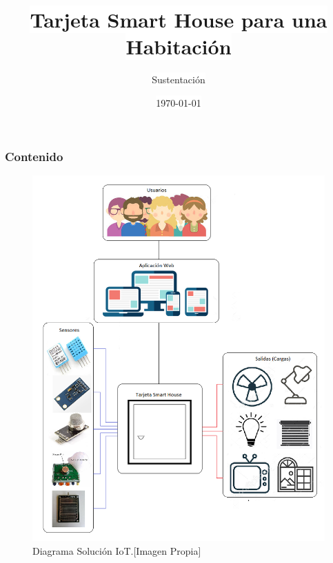 \documentclass[aspectratio=169]{beamer}
\title{\colorbox{white}{Tarjeta Smart House para una Habitación}}
\subtitle{\colorbox{white}{Sustentación}}
\author{\colorbox{white}{John Alejandro Barahona Pineda \and César Andres Tejada Torres}}
\institute{\colorbox{white}{Universidad del Quindío}\\
\colorbox{white}{Armenia, Quindío}}
\date{\colorbox{white}{\today}}
\begin{document}
	\frame{\titlepage}

	
	\begin{frame}
		\frametitle{Contenido}
			\tableofcontents[hideallsubsections]
	\end{frame}


	 	
 
 	\begin{frame}
		
 	\end{frame}
 
 	\begin{frame}
	 	\begin{figure}
	 		\centering
	 		\caption{Diagrama Solución IoT.[Imagen Propia]}
	 		\label{fig:diag}
	 		\includegraphics[width=0.4\linewidth]{Imagenes/Diagramas}
	 	\end{figure} 	
 	\end{frame}
 	
\end{document}
